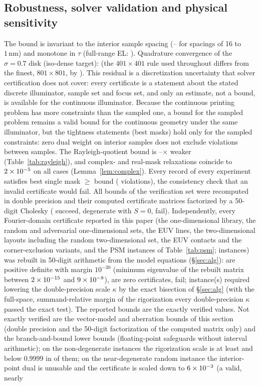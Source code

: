 \documentclass[11pt,a4paper]{article}
\newcommand{\SI}[2]{\ensuremath{#1\,\mathrm{#2}}}\newcommand{\SIrange}[3]{\ensuremath{#1\text{--}#2\,\mathrm{#3}}}
\theoremstyle{remark}\newtheorem*{remark}{Remark}
\begin{document}
\subsection{Robustness, solver validation and physical sensitivity}\label{sec:robust}
The bound is invariant to the interior sample spacing (\spacingMin--\spacingMax{} for spacings of 16 to \SI{1}{nm}) and monotone in $\tau$ (full-range EL: \marginList). Quadrature convergence of the $\sigma=0.7$ disk (iso-dense target): \quadList{} (the $401\times401$ rule used throughout differs from the finest, $801\times801$, by \quadRefDiff). This residual is a discretization uncertainty that solver certification does not cover: every certificate is a statement about the stated discrete illuminator, sample set and focus set, and only an estimate, not a bound, is available for the continuous illuminator. Because the continuous printing problem has more constraints than the sampled one, a bound for the sampled problem remains a valid bound for the continuous geometry under the same illuminator, but the tightness statements (best masks) hold only for the sampled constraints: zero dual weight on interior samples does not exclude violations between samples. The Rayleigh-quotient bound is \rayLo--\rayHi$\times$ weaker (Table~\ref{tab:rayleigh}), and complex- and real-mask relaxations coincide to $2\times10^{-5}$ on all \rayN{} cases (Lemma~\ref{lem:complex}). Every record of every experiment satisfies best single mask $\ge$ bound (\certViolations{} violations), the consistency check that an invalid certificate would fail. All \verN{} bounds of the verification set were recomputed in double precision and their computed certificate matrices factorized by a 50-digit Cholesky (\verChol{} succeed, \verDeg{} degenerate with $S=0$, \verFail{} fail). Independently, every Fourier-domain certificate reported in this paper (the one-dimensional library, the random and adversarial one-dimensional sets, the EUV lines, the two-dimensional layouts including the random two-dimensional set, the EUV contacts and the corner-exclusion variants, and the PSM instances of Table~\ref{tab:psm}; \exactN{} instances) was rebuilt in 50-digit arithmetic from the model equations (\S\ref{sec:alg}): \exactPD{} are positive definite with margin $10^{-30}$ (minimum eigenvalue of the rebuilt matrix between $2\times10^{-15}$ and $9\times10^{-8}$), \exactZero{} are zero certificates, \exactFail{} fail; \exactBisected{} instance(s) required lowering the double-precision scale $\kappa$ by the exact bisection of \S\ref{sec:alg} (with the full-space, summand-relative margin of the rigorization every double-precision $\kappa$ passed the exact test). The reported bounds are the exactly verified values. Not exactly verified are the vector-model and aberration bounds of this section (double precision and the 50-digit factorization of the computed matrix only) and the branch-and-bound lower bounds (floating-point safeguards without interval arithmetic); on the \verNonDegN{} non-degenerate instances the rigorization scale is at least \verKappaMin{} and below $0.9999$ in \verKappaBelow{} of them; on the near-degenerate random instance the interior-point dual is unusable and the certificate is scaled down to $6\times10^{-3}$ (a valid, nearly 
\end{document}
